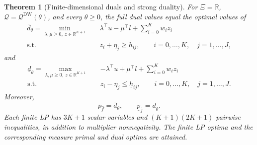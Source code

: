 \documentclass[review,11pt,3p,authoryear,nopreprintline]{elsarticle}
\newtheorem{theorem}{Theorem}
\begin{document}
\begin{theorem}[Finite-dimensional duals and strong duality]
  \label{thm-finite-dual-reformulations}
  For $\Xi=\mathbb R$, $\mathscr Q=\mathscr Q^{\mathrm{DW}}(\theta)$, and every $\theta\ge0$, the full dual values equal the optimal values of
  \begin{equation}
    \begin{aligned}
      \overline d_\theta
      =\min_{\lambda,\mu\ge0,\ z\in\mathbb R^{K+1}}\quad&
        \lambda^\top u-\mu^\top l+\sum_{i=0}^K w_i z_i\\
      \text{s.t.}\quad&
        z_i+\eta_j\ge\overline h_{ij},
        \qquad i=0,\ldots,K,\quad j=1,\ldots,J,
    \end{aligned}
    \label{eq-finite-upper-dual}
  \end{equation}
  and
  \begin{equation}
    \begin{aligned}
      \underline d_\theta
      =\max_{\lambda,\mu\ge0,\ z\in\mathbb R^{K+1}}\quad&
        -\lambda^\top u+\mu^\top l+\sum_{i=0}^K w_i z_i\\
      \text{s.t.}\quad&
        z_i-\eta_j\le\underline h_{ij},
        \qquad i=0,\ldots,K,\quad j=1,\ldots,J.
    \end{aligned}
    \label{eq-finite-lower-dual}
  \end{equation}
  Moreover,
  \begin{equation}
    \overline p_{\hat f}=\overline d_\theta,\qquad
    \underline p_{\hat f}=\underline d_\theta.
    \label{eq-strong-duality}
  \end{equation}
  Each finite LP has $3K+1$ scalar variables and $(K+1)(2K+1)$ pairwise inequalities, in addition to multiplier nonnegativity. The finite LP optima and the corresponding measure primal and dual optima are attained.
\end{theorem}
\end{document}
